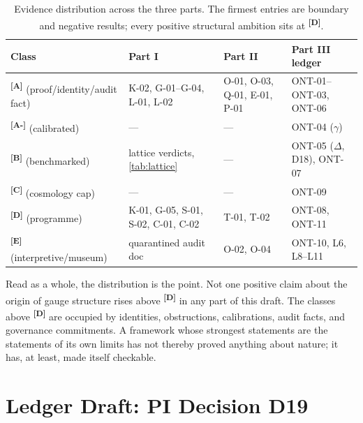 \documentclass[12pt,a4paper,twoside]{article}
\theoremstyle{plain}
\theoremstyle{definition}
\theoremstyle{remark}
\newcommand{\catmark}[1]{\textsuperscript{\textsf{\textbf{[#1]}}}}
\begin{document}
\begin{table}[htbp]
\centering\scriptsize
\begin{tabular}{@{}p{2.5cm}p{3.4cm}p{3.2cm}p{3.4cm}@{}}
\toprule
Class & Part I & Part II & Part III ledger \\
\midrule
\catmark{A} (proof/identity/audit fact) & K-02, G-01--G-04, L-01, L-02 & O-01, O-03, Q-01, E-01, P-01 & ONT-01--ONT-03, ONT-06 \\
\catmark{A-} (calibrated) & --- & --- & ONT-04 ($\gamma$) \\
\catmark{B} (benchmarked) & lattice verdicts, \cref{tab:lattice} & --- & ONT-05 ($\Delta$, D18), ONT-07 \\
\catmark{C} (cosmology cap) & --- & --- & ONT-09 \\
\catmark{D} (programme) & K-01, G-05, S-01, S-02, C-01, C-02 & T-01, T-02 & ONT-08, ONT-11 \\
\catmark{E} (interpretive/museum) & quarantined audit doc & O-02, O-04 & ONT-10, L6, L8--L11 \\
\bottomrule
\end{tabular}
\caption{Evidence distribution across the three parts. The firmest
entries are boundary and negative results; every positive structural
ambition sits at \catmark{D}.}
\label{tab:consolidated}
\end{table}

\noindent Read as a whole, the distribution is the point. Not one
positive claim about the origin of gauge structure rises above
\catmark{D} in any part of this draft. The classes above \catmark{D} are
occupied by identities, obstructions, calibrations, audit facts, and
governance commitments. A framework whose strongest statements are the
statements of its own limits has not thereby proved anything about
nature; it has, at least, made itself checkable.

\section{Ledger Draft: PI Decision D19}
\label{sec:d19-ledger-draft}
\end{document}
